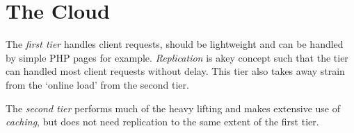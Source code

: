 \documentclass[a4paper]{article}
\begin{document}
\section{The Cloud}

The \textit{first tier} handles client requests, should be lightweight and can be handled by simple PHP pages for example. \textit{Replication} is akey concept such that the tier can handled most client requests without delay. This tier also takes away strain from the `online load' from the second tier.

The \textit{second tier} performs much of the heavy lifting and makes extensive use of \textit{caching}, but does not need replication to the same extent of the first tier.
\end{document}
